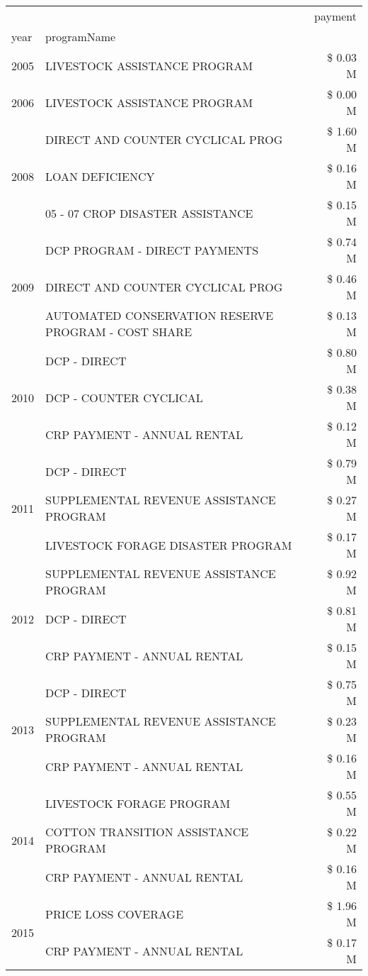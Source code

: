 \begin{tabular}{llr}
\toprule
 &  & payment \\
year & programName &  \\
\midrule
2005 & LIVESTOCK ASSISTANCE PROGRAM & \$ 0.03 M \\
\cline{1-3}
2006 & LIVESTOCK ASSISTANCE PROGRAM & \$ 0.00 M \\
\cline{1-3}
\multirow[t]{3}{*}{2008} & DIRECT AND COUNTER CYCLICAL PROG & \$ 1.60 M \\
 & LOAN DEFICIENCY & \$ 0.16 M \\
 & 05 - 07 CROP DISASTER ASSISTANCE & \$ 0.15 M \\
\cline{1-3}
\multirow[t]{3}{*}{2009} & DCP PROGRAM - DIRECT PAYMENTS & \$ 0.74 M \\
 & DIRECT AND COUNTER CYCLICAL PROG & \$ 0.46 M \\
 & AUTOMATED CONSERVATION RESERVE PROGRAM - COST SHARE & \$ 0.13 M \\
\cline{1-3}
\multirow[t]{3}{*}{2010} & DCP - DIRECT & \$ 0.80 M \\
 & DCP - COUNTER CYCLICAL & \$ 0.38 M \\
 & CRP PAYMENT - ANNUAL RENTAL & \$ 0.12 M \\
\cline{1-3}
\multirow[t]{3}{*}{2011} & DCP - DIRECT & \$ 0.79 M \\
 & SUPPLEMENTAL REVENUE ASSISTANCE PROGRAM & \$ 0.27 M \\
 & LIVESTOCK FORAGE DISASTER PROGRAM & \$ 0.17 M \\
\cline{1-3}
\multirow[t]{3}{*}{2012} & SUPPLEMENTAL REVENUE ASSISTANCE PROGRAM & \$ 0.92 M \\
 & DCP - DIRECT & \$ 0.81 M \\
 & CRP PAYMENT - ANNUAL RENTAL & \$ 0.15 M \\
\cline{1-3}
\multirow[t]{3}{*}{2013} & DCP - DIRECT & \$ 0.75 M \\
 & SUPPLEMENTAL REVENUE ASSISTANCE PROGRAM & \$ 0.23 M \\
 & CRP PAYMENT - ANNUAL RENTAL & \$ 0.16 M \\
\cline{1-3}
\multirow[t]{3}{*}{2014} & LIVESTOCK FORAGE PROGRAM & \$ 0.55 M \\
 & COTTON TRANSITION ASSISTANCE PROGRAM & \$ 0.22 M \\
 & CRP PAYMENT - ANNUAL RENTAL & \$ 0.16 M \\
\cline{1-3}
\multirow[t]{3}{*}{2015} & PRICE LOSS COVERAGE & \$ 1.96 M \\
 & CRP PAYMENT - ANNUAL RENTAL & \$ 0.17 M \\

\end{tabular}

